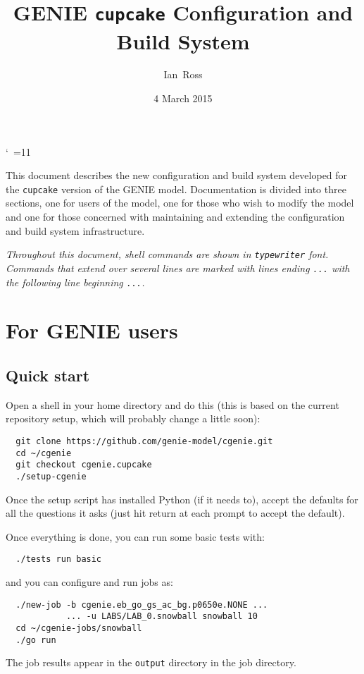 \documentclass[a4paper,10pt,article]{memoir}
\title{GENIE \texttt{cupcake} Configuration and Build System}
\author{Ian~Ross}
\date{4 March 2015}
\begin{document}
\catcode`~=11    %

\maketitle

This document describes the new configuration and build system
developed for the \texttt{cupcake} version of the GENIE model.
Documentation is divided into three sections, one for users of the
model, one for those who wish to modify the model and one for those
concerned with maintaining and extending the configuration and build
system infrastructure.

\emph{Throughout this document, shell commands are shown in
  \texttt{typewriter} font.  Commands that extend over several lines
  are marked with lines ending \texttt{...} with the following line
  beginning \texttt{...}.}

\chapter{For GENIE users}

\section{Quick start}

Open a shell in your home directory and do this (this is based on the
current repository setup, which will probably change a little soon):
\begin{verbatim}
  git clone https://github.com/genie-model/cgenie.git
  cd ~/cgenie
  git checkout cgenie.cupcake
  ./setup-cgenie
\end{verbatim}
Once the setup script has installed Python (if it needs to), accept
the defaults for all the questions it asks (just hit return at each
prompt to accept the default).

Once everything is done, you can run some basic tests with:
\begin{verbatim}
  ./tests run basic
\end{verbatim}
and you can configure and run jobs as:
\begin{verbatim}
  ./new-job -b cgenie.eb_go_gs_ac_bg.p0650e.NONE ...
            ... -u LABS/LAB_0.snowball snowball 10
  cd ~/cgenie-jobs/snowball
  ./go run
\end{verbatim}
The job results appear in the \texttt{output} directory in the job
directory.
\end{document}

